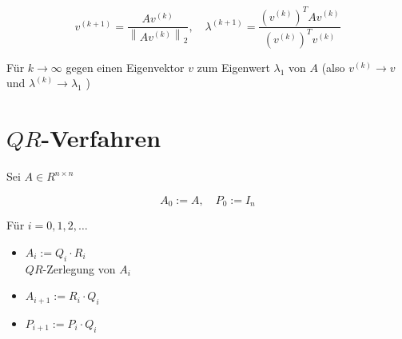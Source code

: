 \documentclass[10pt]{article}
\begin{document}
$$
v^{(k+1)}=\frac{A v^{(k)}}{\left\|A v^{(k)}\right\|_{2}}, \quad \lambda^{(k+1)}=\frac{\left(v^{(k)}\right)^{T} A v^{(k)}}{\left(v^{(k)}\right)^{T} v^{(k)}}
$$

Für $k \rightarrow \infty$ gegen einen Eigenvektor $v$ zum Eigenwert $\lambda_{1}$ von $A$ (also $v^{(k)} \rightarrow v$ und $\lambda^{(k)} \rightarrow \lambda_{1}$ )

\section*{$Q R$-Verfahren}
Sei $A \in R^{n \times n}$

$$
A_{0}:=A, \quad P_{0}:=I_{n}
$$

Für $i=0,1,2, \ldots$

\begin{itemize}
  \item $A_{i}:=Q_{i} \cdot R_{i}$\\
$Q R$-Zerlegung von $A_{i}$
  \item $A_{i+1}:=R_{i} \cdot Q_{i}$
  \item $P_{i+1}:=P_{i} \cdot Q_{i}$
\end{itemize}
\end{document}

